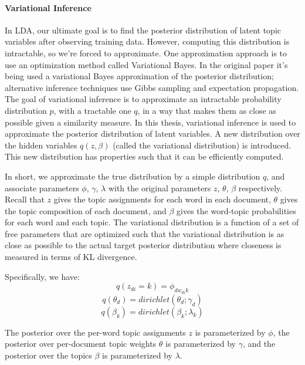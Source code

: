 \documentclass[12pt]{report}
\begin{document}
\paragraph{Variational Inference}

In LDA, our ultimate goal is to find the posterior distribution of latent topic variables after observing training data. However, computing this distribution is intractable, so we’re forced to approximate. One approximation approach is to 
use an optimization method called Variational Bayes. In the original paper it's 
being used a variational Bayes approximation of the posterior distribution;\cite{blei2003latent} alternative inference techniques use Gibbs sampling and
expectation propagation. The goal of variational inference is to approximate an
intractable probability distribution $p$, with a tractable one $q$, in a way
that makes them as close as possible given a similarity measure. In this thesis,
variational inference is used to approximate the posterior distribution of
latent variables. A new distribution over the hidden variables $q(z, \beta)$
(called the variational distribution) is  introduced. This new distribution has
properties such that it can be efficiently computed.\cite{Fox2011ATO}

In short, we approximate the true distribution by a simple distribution $q$, and associate parameters $\phi$, $\gamma$, $\lambda$ with the original parameters 
$z$, $\theta$, $\beta$ respectively. Recall that $z$ gives the topic assignments 
for each word in each document, $\theta$ gives the topic composition of each 
document, and $\beta$ gives the word-topic probabilities for each word and each 
topic. The variational distribution is a function of a set of free parameters that 
are optimized such that the variational distribution is as close as possible to 
the actual target posterior distribution where closeness is measured in terms of 
KL divergence.

Specifically, we have:
\begin{equation}
q(z_{di}=k) = \phi_{dw_{di}k}
\end{equation}
\begin{equation}
q(\theta_{d}) = dirichlet(\theta_{d}; \gamma_{d})
\end{equation}
\begin{equation}
q(\beta_{k}) = dirichlet(\beta_{k}; \lambda_{k})
\end{equation}

The posterior over the per-word topic assignments $z$ is parameterized by
$\phi$, the posterior over per-document topic weights $\theta$ is parameterized
by $\gamma$, and the posterior over the topics $\beta$ is parameterized by
$\lambda$. 
\end{document}

